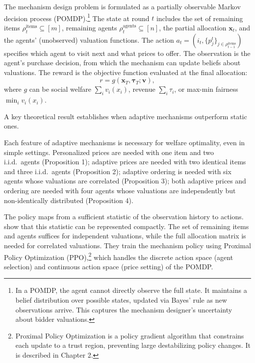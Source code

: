 The mechanism design problem is formulated as a partially observable Markov decision process (POMDP).\footnote{In a POMDP, the agent cannot directly observe the full state. It maintains a belief distribution over possible states, updated via Bayes' rule as new observations arrive. This captures the mechanism designer's uncertainty about bidder valuations.} The state at round $t$ includes the set of remaining items $\rho_t^{\text{items}} \subseteq [m]$, remaining agents $\rho_t^{\text{agents}} \subseteq [n]$, the partial allocation $\mathbf{x}_t$, and the agents' (unobserved) valuation functions. The action $a_t = (i_t, \{p_j^t\}_{j \in \rho_{t-1}^{\text{items}}})$ specifies which agent to visit next and what prices to offer. The observation is the agent's purchase decision, from which the mechanism can update beliefs about valuations. The reward is the objective function evaluated at the final allocation:
\begin{equation}
r = g(\mathbf{x}_T, \boldsymbol{\tau}_T; \mathbf{v}), \label{eq:brero_reward}
\end{equation}
where $g$ can be social welfare $\sum_{i} v_i(x_i)$, revenue $\sum_i \tau_i$, or max-min fairness $\min_i v_i(x_i)$.

A key theoretical result establishes when adaptive mechanisms outperform static ones.

\begin{theorem}
Each feature of adaptive mechanisms is necessary for welfare optimality, even in simple settings. Personalized prices are needed with one item and two i.i.d.\ agents (Proposition 1); adaptive prices are needed with two identical items and three i.i.d.\ agents (Proposition 2); adaptive ordering is needed with six agents whose valuations are correlated (Proposition 3); both adaptive prices and ordering are needed with four agents whose valuations are independently but non-identically distributed (Proposition 4).
\end{theorem}

The policy maps from a sufficient statistic of the observation history to actions. \citet{BreroEtAl2021} show that this statistic can be represented compactly. The set of remaining items and agents suffices for independent valuations, while the full allocation matrix is needed for correlated valuations. They train the mechanism policy using Proximal Policy Optimization (PPO),\footnote{Proximal Policy Optimization \citep{Schulman2017} is a policy gradient algorithm that constrains each update to a trust region, preventing large destabilizing policy changes. It is described in Chapter 2.} which handles the discrete action space (agent selection) and continuous action space (price setting) of the POMDP.

